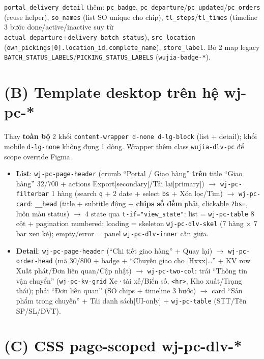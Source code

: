 \texttt{portal\_delivery\_detail} thêm: \texttt{pc\_badge}, \texttt{pc\_departure}/\texttt{pc\_updated}/\texttt{pc\_orders} (reuse helper), \texttt{so\_names} (list SO unique cho chip), \texttt{tl\_steps}/\texttt{tl\_times} (timeline 3 bước done/active/inactive suy từ \texttt{actual\_departure}+\texttt{delivery\_batch\_status}), \texttt{src\_location} (\texttt{own\_pickings[0].location\_id.complete\_name}), \texttt{store\_label}. Bỏ 2 map legacy \texttt{BATCH\_STATUS\_LABELS}/\texttt{PICKING\_STATUS\_LABELS} (\texttt{wujia-badge-*}).

\section{(B) Template desktop trên hệ wj-pc-*}

Thay \textbf{toàn bộ} 2 khối \texttt{content-wrapper d-none d-lg-block} (list + detail); khối mobile \texttt{d-lg-none} không đụng 1 dòng. Wrapper thêm class \texttt{wujia-dlv-pc} để scope override Figma.

\begin{itemize}
  \item \textbf{List}: \texttt{wj-pc-page-header} (crumb ``Portal / Giao hàng'' \textbf{trên} title ``Giao hàng'' 32/700 + actions Export[secondary]/Tải lại[primary]) $\rightarrow$ \texttt{wj-pc-filterbar} 1 hàng (search \texttt{q} + 2 date + select \texttt{bs} + Xóa lọc/Tìm) $\rightarrow$ \texttt{wj-pc-card}: \texttt{\_\_head} (title + subtitle động + \textbf{chips số đếm} phải, clickable \texttt{?bs=}, luôn màu status) $\rightarrow$ 4 state qua \texttt{t-if="view\_state"}: list = \texttt{wj-pc-table} 8 cột + pagination numbered; loading = skeleton \texttt{wj-pc-dlv-skel} (7 hàng × 7 bar xen kẽ); empty/error = panel \texttt{wj-pc-dlv-inner} căn giữa.
  \item \textbf{Detail}: \texttt{wj-pc-page-header} (``Chi tiết giao hàng'' + Quay lại) $\rightarrow$ \texttt{wj-pc-order-head} (mã 30/800 + badge + ``Chuyến giao cho [Hxxx]…'' + KV row Xuất phát/Đơn liên quan/Cập nhật) $\rightarrow$ \texttt{wj-pc-two-col}: trái ``Thông tin vận chuyển'' (\texttt{wj-pc-kv-grid} Xe·tài xế/Biển số, \texttt{<hr>}, Kho xuất/Trạng thái); phải ``Đơn liên quan'' (SO chips + timeline 3 bước) $\rightarrow$ card ``Sản phẩm trong chuyến'' + Tải danh sách[UI-only] + \texttt{wj-pc-table} (STT/Tên SP/SL/ĐVT).
\end{itemize}

\section{(C) CSS page-scoped wj-pc-dlv-*}


